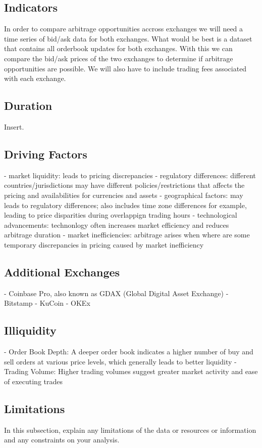 \documentclass{article}
\begin{document}
\subsection{Indicators}
In order to compare arbitrage opportunities accross exchanges we will need a time series of bid/ask data for both exchanges. What would be best is a dataset that contains all orderbook updates for both exchanges. With this we can compare the bid/ask prices of the two exchanges to determine if arbitrage opportunities are possible. We will also have to include trading fees associated with each exchange.
\subsection{Duration}
Insert.
\subsection{Driving Factors}
- market liquidity: leads to pricing discrepancies 
- regulatory differences: different countries/jurisdictions may have different policies/restrictions that affects the pricing and availabilities for currencies and assets 
- geographical factors: may leads to regulatory differences; also includes time zone differences for example, leading to price disparities during overlappign trading hours 
- technological advancements: technonlogy often increases market efficiency and reduces arbitrage duration 
- market inefficiencies: arbitrage arises when where are some temporary discrepancies in pricing caused by market inefficiency
\subsection{Additional Exchanges}
- Coinbase Pro, also known as GDAX (Global Digital Asset Exchange)
- Bitstamp
- KuCoin
- OKEx
\subsection{Illiquidity}
- Order Book Depth: A deeper order book indicates a higher number of buy and sell orders at various price levels, which generally leads to better liquidity
- Trading Volume: Higher trading volumes suggest greater market activity and ease of executing trades
\subsection{Limitations}
In this subsection, explain any limitations of the data or resources or information and any constraints on your analysis.
\end{document}
